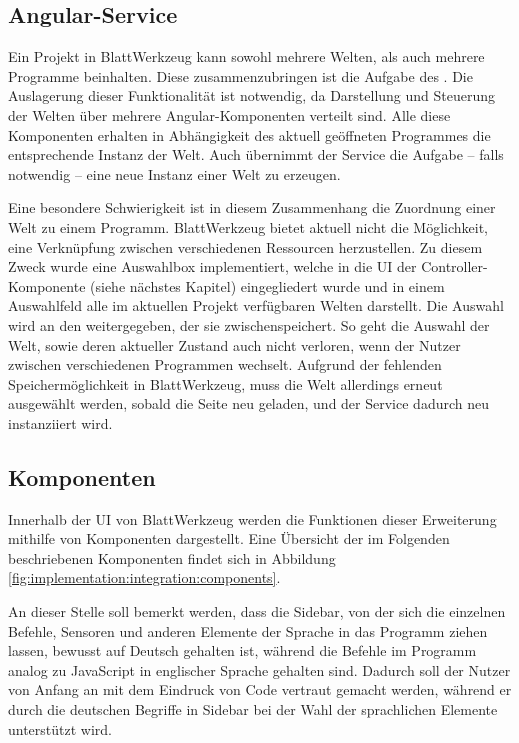 \subsection{Angular-Service}
\label{sec:implementation:integration:ng-service}

Ein Projekt in BlattWerkzeug kann sowohl mehrere Welten, als auch mehrere Programme beinhalten. Diese zusammenzubringen ist die Aufgabe des . Die Auslagerung dieser Funktionalität ist notwendig, da Darstellung und Steuerung der Welten über mehrere Angular-Komponenten verteilt sind. Alle diese Komponenten erhalten in Abhängigkeit des aktuell geöffneten Programmes die entsprechende Instanz der Welt. Auch übernimmt der Service die Aufgabe -- falls notwendig -- eine neue Instanz einer Welt zu erzeugen.

Eine besondere Schwierigkeit ist in diesem Zusammenhang die Zuordnung einer Welt zu einem Programm. BlattWerkzeug bietet aktuell nicht die Möglichkeit, eine Verknüpfung zwischen verschiedenen Ressourcen herzustellen. Zu diesem Zweck wurde eine Auswahlbox implementiert, welche in die UI der Controller-Komponente (siehe nächstes Kapitel) eingegliedert wurde und in einem Auswahlfeld alle im aktuellen Projekt verfügbaren Welten darstellt. Die Auswahl wird an den  weitergegeben, der sie zwischenspeichert. So geht die Auswahl der Welt, sowie deren aktueller Zustand auch nicht verloren, wenn der Nutzer zwischen verschiedenen Programmen wechselt. Aufgrund der fehlenden Speichermöglichkeit in BlattWerkzeug, muss die Welt allerdings erneut ausgewählt werden, sobald die Seite neu geladen, und der Service dadurch neu instanziiert wird.

\subsection{Komponenten}
\label{sec:implementation:integration:components}

Innerhalb der UI von BlattWerkzeug werden die Funktionen dieser Erweiterung mithilfe von Komponenten dargestellt. Eine Übersicht der im Folgenden beschriebenen Komponenten findet sich in Abbildung \ref{fig:implementation:integration:components}.

An dieser Stelle soll bemerkt werden, dass die Sidebar, von der sich die einzelnen Befehle, Sensoren und anderen Elemente der Sprache in das Programm ziehen lassen, bewusst auf Deutsch gehalten ist, während die Befehle im Programm analog zu JavaScript in englischer Sprache gehalten sind. Dadurch soll der Nutzer von Anfang an mit dem Eindruck von Code vertraut gemacht werden, während er durch die deutschen Begriffe in Sidebar bei der Wahl der sprachlichen Elemente unterstützt wird.

